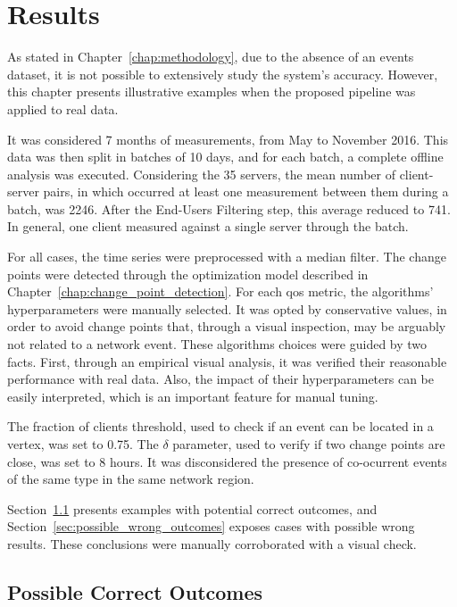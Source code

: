 \chapter{Results}
\label{chap:results}

As stated in Chapter~\ref{chap:methodology}, due to the absence of an events
dataset, it is not possible to extensively study the system's accuracy.
However, this chapter presents illustrative examples when the proposed pipeline
was applied to real data.

It was considered 7 months of measurements, from May to November 2016.
This data was then split in batches of 10 days, and for each batch,
a complete offline analysis was executed.
Considering the 35 servers, the mean number of client-server
pairs, in which occurred at least one measurement between them during a batch,
was 2246.
After the End-Users Filtering step, this average reduced to 741.
In general, one client measured against a single server through the batch.

For all cases, the time series were preprocessed with a median filter.
The change points were detected through the optimization model described in
Chapter~\ref{chap:change_point_detection}.
For each \gls*{qos} metric, the algorithms' hyperparameters were manually selected.
It was opted by conservative values, in order to avoid change points that,
through a visual inspection, may be arguably not related to a network event.
These algorithms choices were guided by two facts.
First, through an empirical visual analysis,
it was verified their reasonable performance with real data.
Also, the impact of their hyperparameters can be easily interpreted, which is
an important feature for manual tuning.

The fraction of clients threshold, used to check if an event can be
located in a vertex, was set to 0.75. The $\delta$ parameter, used to verify if
two change points are close, was set to 8 hours.
It was disconsidered the presence of co-ocurrent events of the same type in the
same network region.

Section~\ref{sec:possible_correct_outcomes} presents examples with potential
correct outcomes, and Section~\ref{sec:possible_wrong_outcomes} exposes
cases with possible wrong results. These conclusions were manually corroborated
with a visual check.

\section{Possible Correct Outcomes}
\label{sec:possible_correct_outcomes}

